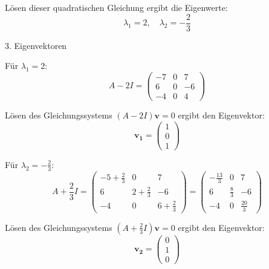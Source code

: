 Lösen dieser quadratischen Gleichung ergibt die Eigenwerte:
\[
\lambda_1 = 2, \quad \lambda_2 = -\frac{2}{3}
\]

3. Eigenvektoren

Für \(\lambda_1 = 2\):
\[
A - 2I = \begin{pmatrix}
-7 & 0 & 7 \\
6 & 0 & -6 \\
-4 & 0 & 4
\end{pmatrix}
\]

Lösen des Gleichungssystems \((A - 2I)\mathbf{v} = 0\) ergibt den Eigenvektor:
\[
\mathbf{v_1} = \begin{pmatrix}
1 \\
0 \\
1
\end{pmatrix}
\]

Für \(\lambda_2 = -\frac{2}{3}\):
\[
A + \frac{2}{3}I = \begin{pmatrix}
-5 + \frac{2}{3} & 0 & 7 \\
6 & 2 + \frac{2}{3} & -6 \\
-4 & 0 & 6 + \frac{2}{3}
\end{pmatrix}
= \begin{pmatrix}
-\frac{13}{3} & 0 & 7 \\
6 & \frac{8}{3} & -6 \\
-4 & 0 & \frac{20}{3}
\end{pmatrix}
\]

Lösen des Gleichungssystems \((A + \frac{2}{3}I)\mathbf{v} = 0\) ergibt den Eigenvektor:
\[
\mathbf{v_2} = \begin{pmatrix}
0 \\
1 \\
0
\end{pmatrix}
\]
